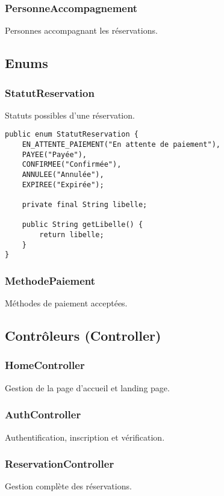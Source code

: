\documentclass[12pt,a4paper]{article}
\begin{document}
\subsubsection{PersonneAccompagnement}
Personnes accompagnant les réservations.

\subsection{Enums}

\subsubsection{StatutReservation}
Statuts possibles d'une réservation.

\begin{lstlisting}[caption=Enum StatutReservation]
public enum StatutReservation {
    EN_ATTENTE_PAIEMENT("En attente de paiement"),
    PAYEE("Payée"),
    CONFIRMEE("Confirmée"),
    ANNULEE("Annulée"),
    EXPIREE("Expirée");
    
    private final String libelle;
    
    public String getLibelle() {
        return libelle;
    }
}
\end{lstlisting}

\subsubsection{MethodePaiement}
Méthodes de paiement acceptées.

\subsection{Contrôleurs (Controller)}

\subsubsection{HomeController}
Gestion de la page d'accueil et landing page.

\subsubsection{AuthController}
Authentification, inscription et vérification.

\subsubsection{ReservationController}
Gestion complète des réservations.
\end{document}
